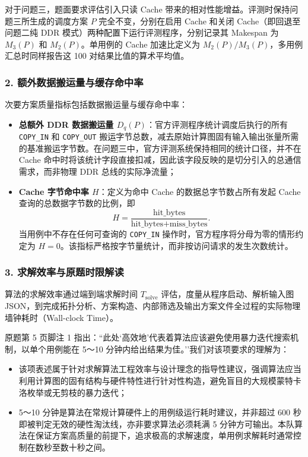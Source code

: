 \documentclass[anonymous,notoc]{gmcm2026}
\providecommand{\tightlist}{\setlength{\itemsep}{0pt}\setlength{\parskip}{0pt}}
\begin{document}
对于问题三，题面要求评估引入只读 Cache 带来的相对性能增益。评测时保持问题三所生成的调度方案 \(P\) 完全不变，分别在启用 Cache 和关闭 Cache（即回退至问题二纯 DDR 模式）两种配置下运行评测程序，分别记录其 Makespan 为 \(M_3(P)\) 和 \(M_2(P)\)。单用例的 Cache 加速比定义为 \(M_2(P) / M_3(P)\)，多用例汇总时同样报告这 100 对结果比值的算术平均值。

\subsubsection{2. 额外数据搬运量与缓存命中率}

次要方案质量指标包括数据搬运量与缓存命中率：

\begin{itemize}
\tightlist
\item
  \textbf{总额外 DDR 数据搬运量 \(D_q(P)\)}：官方评测程序统计调度后执行的所有 \texttt{COPY\_IN} 和 \texttt{COPY\_OUT} 搬运字节总数，减去原始计算图固有输入输出张量所需的基准搬运字节数。在问题三中，官方评测系统保持相同的统计口径，并不在 Cache 命中时将该统计字段直接扣减，因此该字段反映的是切分引入的总通信需求，而非物理 DDR 总线的实际净流量；
\item
  \textbf{Cache 字节命中率 \(H\)}：定义为命中 Cache 的数据总字节数占所有发起 Cache 查询的总数据字节数的比例，即 \begin{equation}
H = \frac{\text{hit\_bytes}}{\text{hit\_bytes} + \text{miss\_bytes}}.
\end{equation} 当用例中不存在任何可查询的 \texttt{COPY\_IN} 操作时，官方程序将分母为零的情形约定为 \(H = 0\)。该指标严格按字节量统计，而非按访问请求的发生次数统计。
\end{itemize}

\subsubsection{3. 求解效率与原题时限解读}

算法的求解效率通过端到端求解时间 \(T_{\text{solve}}\) 评估，度量从程序启动、解析输入图 JSON，到完成拓扑分析、方案构造、内部筛选及输出方案文件全过程的实际物理墙钟耗时（Wall-clock Time）。

原题第 5 页脚注 1 指出：``此处`高效地'代表着算法应该避免使用暴力迭代搜索机制，以单个用例能在 5～10 分钟内给出结果为佳。''我们对该项要求的理解为：

\begin{itemize}
\tightlist
\item
  该项表述属于针对求解算法工程效率与设计理念的指导性建议，强调算法应当利用计算图的固有结构与硬件特性进行针对性构造，避免盲目的大规模蒙特卡洛枚举或无剪枝的暴力迭代；
\item
  5～10 分钟是算法在常规计算硬件上的用例级运行耗时建议，并非超过 600 秒即被判定无效的硬性淘汰线，亦非要求算法必须耗满 5 分钟方可输出。本队算法在保证方案高质量的前提下，追求极高的求解速度，单用例求解耗时通常控制在数秒至数十秒之间。
\end{itemize}
\end{document}
